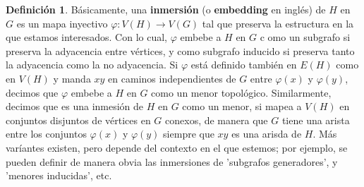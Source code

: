 \documentclass[12pt]{report}
\theoremstyle{plain}
\theoremstyle{definition}
\newtheorem{definition}[theorem]{Definición}
\begin{document}
\begin{definition}
Básicamente, una \textbf{inmersión} (o \textbf{embedding} en inglés) de $H$ en $G$ es un mapa inyectivo $\varphi : V(H) \rightarrow V(G)$ tal que preserva la estructura en la que estamos interesados. Con lo cual, $\varphi$ embebe a $H$ en $G$ c omo un subgrafo si preserva la adyacencia entre vértices, y como subgrafo inducido si preserva tanto la adyacencia como la no adyacencia. Si $\varphi$ está definido también en $E(H)$ como en $V(H)$ y manda $xy$ en caminos independientes de $G$ entre $\varphi (x)$ y $\varphi (y)$, decimos que $\varphi$ embebe a $H$ en $G$ como un menor topológico. Similarmente, decimos que es una inmesión de $H$ en $G$ como un menor, si mapea a $V(H)$ en conjuntos disjuntos de vértices en $G$ conexos, de manera que $G$ tiene una arista entre los conjuntos $\varphi (x)$ y $\varphi (y)$ siempre que $xy$ es una arisda de $H$. Más varíantes existen, pero depende del contexto en el que estemos; por ejemplo, se pueden definir de manera obvia las inmersiones de 'subgrafos generadores', y 'menores inducidas', etc.
\end{definition}


\end{document}

